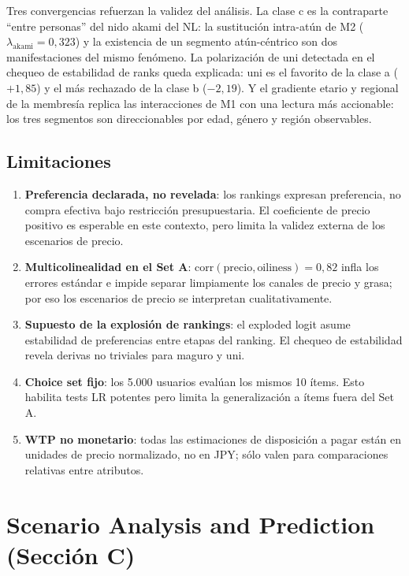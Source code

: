 \documentclass[12pt,a4paper]{article}
\begin{document}
Tres convergencias refuerzan la validez del análisis. La clase c es la contraparte ``entre personas'' del nido akami del NL: la sustitución intra-atún de M2 ($\lambda_{\text{akami}} = 0{,}323$) y la existencia de un segmento atún-céntrico son dos manifestaciones del mismo fenómeno. La polarización de uni detectada en el chequeo de estabilidad de ranks queda explicada: uni es el favorito de la clase a ($+1{,}85$) y el más rechazado de la clase b ($-2{,}19$). Y el gradiente etario y regional de la membresía replica las interacciones de M1 con una lectura más accionable: los tres segmentos son direccionables por edad, género y región observables.

\subsection{Limitaciones}
\label{sec:limit}

\begin{enumerate}[nosep]
  \item \textbf{Preferencia declarada, no revelada}: los rankings expresan preferencia, no compra efectiva bajo restricción presupuestaria. El coeficiente de precio positivo es esperable en este contexto, pero limita la validez externa de los escenarios de precio.
  \item \textbf{Multicolinealidad en el Set A}: $\text{corr}(\text{precio}, \text{oiliness}) = 0{,}82$ infla los errores estándar e impide separar limpiamente los canales de precio y grasa; por eso los escenarios de precio se interpretan cualitativamente.
  \item \textbf{Supuesto de la explosión de rankings}: el exploded logit asume estabilidad de preferencias entre etapas del ranking. El chequeo de estabilidad revela derivas no triviales para maguro y uni.
  \item \textbf{Choice set fijo}: los 5.000 usuarios evalúan los mismos 10 ítems. Esto habilita tests LR potentes pero limita la generalización a ítems fuera del Set A.
  \item \textbf{WTP no monetario}: todas las estimaciones de disposición a pagar están en unidades de precio normalizado, no en JPY; sólo valen para comparaciones relativas entre atributos.
\end{enumerate}

\section{Scenario Analysis and Prediction (Sección C)}
\label{sec:C}
\end{document}

